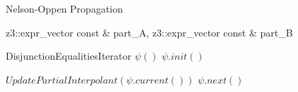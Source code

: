 \begin{algorithm}[!ht] \label{thcomb_propagation_loop}
  \caption{ Nelson-Oppen Propagation }
  \linespread{\separationline}\selectfont
  \begin{algorithmic}[2]
     { 
      z3::expr\_vector const \& part\_A, 
      z3::expr\_vector const \& part\_B 
  }


    \State DisjunctionEqualitiesIterator $\psi()$
    \State $\psi.init()$

    \EndIf
    \EndIf


    \Else
    \EndIf

    \Else

    \Else
    \EndIf

    \EndIf

    \State $UpdatePartialInterpolant(\psi.current())$
    \State $\psi.next()$

    \EndWhile

    \EndProcedure
  \end{algorithmic}
\end{algorithm}

